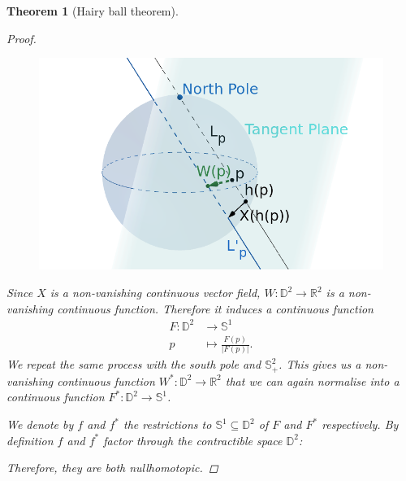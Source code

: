 \documentclass[A4paper, 12pt, british, reqno]{amsart}
\newcommand{\bbD}{\mathbb{D}}
\newcommand{\R}{\mathbb{R}} %
\newcommand{\bbS}{\mathbb{S}}
\theoremstyle{plain}
\newtheorem{thm}{Theorem}[section]
\theoremstyle{definition}
\theoremstyle{remark}
\theoremstyle{plain}
\theoremstyle{definition}
\theoremstyle{remark}
\theoremstyle{plain}
\theoremstyle{definition}
\theoremstyle{remark}
\begin{document}
\begin{thm}[Hairy ball theorem]
\begin{proof}
	\begin{figure}[htp]
	    \centering
	    \includegraphics[scale=.4]{HairyBallW.png}
	\end{figure}

	Since $X$ is a non-vanishing continuous vector field, $W\colon \bbD^{2}\to \R^{2}$ is a non-vanishing continuous function.
	Therefore it induces a continuous function
	\begin{align*}
	    F\colon \bbD^{2} &\longrightarrow \bbS^{1} \\
	    p &\longmapsto \frac{F(p)}{|F(p)|}.
	\end{align*}
	We repeat the same process with the south pole and $\bbS^{2}_{+}$.
	This gives us a non-vanishing continuous function $W^{*}\colon \bbD^{2}\to \R^{2}$ that we can again normalise into a continuous function $F^{*}\colon \bbD^{2}\to \bbS^{1}$.

	We denote by $f$ and $f^{*}$ the restrictions to $\bbS^{1}\subseteq \bbD^{2}$ of $F$ and $F^{*}$ respectively.
	By definition $f$ and $f^{*}$ factor through the contractible space $\bbD^{2}$:
	\begin{center}
	\end{center}
	Therefore, they are both nullhomotopic.


\end{proof}
\end{thm}
\end{document}
